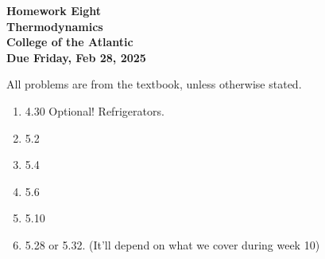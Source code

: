 \documentclass[12pt]{article}
\begin{document}
\pagestyle{empty}
 
\begin{center}
{\LARGE {\bf Homework Eight}}\\
\medskip
{\Large {\bf Thermodynamics}}\\
\medskip
{\Large {\bf College of the Atlantic}}\\
\medskip
{ {\bf Due Friday, Feb 28, 2025}}\\  
\end{center}
\medskip


\noindent All problems are from the textbook, unless otherwise stated. 


\begin{enumerate}
  \setlength{\itemsep}{4mm}

\item 4.30 Optional! Refrigerators.
\item 5.2
\item 5.4
\item 5.6
\item 5.10
\item 5.28 or 5.32. (It'll depend on what we cover during week 10)
   
\end{enumerate}
\end{document}
